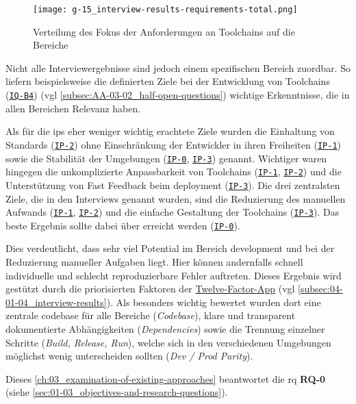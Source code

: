 \begin{figure}[h]
    \centering
    \texttt{[image: g-15\_interview-results-requirements-total.png]}
    \caption{Verteilung des Fokus der Anforderungen an Toolchains auf die Bereiche}
    \label{fig:g-15_interview-results-requirements-total}
\end{figure}

Nicht alle Interviewergebnisse sind jedoch einem spezifischen Bereich zuordbar. So liefern beispielsweise die definierten Ziele bei der Entwicklung von Toolchains (\texttt{\hyperref[subsec:AA-01-02_half-open-questions]{IQ-B4}}) (\acrshort{vgl} \autoref{subsec:AA-03-02_half-open-questions}) wichtige Erkenntnisse, die in allen Bereichen Relevanz haben.

Als für die \Glspl{ip} eher weniger wichtig erachtete Ziele wurden die Einhaltung von Standards (\texttt{\hyperref[sec:AA-02_interview-persons]{IP-2}}) ohne Einschränkung der Entwickler in ihren Freiheiten (\texttt{\hyperref[sec:AA-02_interview-persons]{IP-1}}) sowie die Stabilität der Umgebungen (\texttt{\hyperref[sec:AA-02_interview-persons]{IP-0}}, \texttt{{\hyperref[sec:AA-02_interview-persons]{IP-3}}}) genannt. Wichtiger waren hingegen die unkomplizierte Anpassbarkeit von Toolchains (\texttt{\hyperref[sec:AA-02_interview-persons]{IP-1}}, \texttt{\hyperref[sec:AA-02_interview-persons]{IP-2}}) und die Unterstützung von Fast Feedback beim \Gls{deployment} (\texttt{\hyperref[sec:AA-02_interview-persons]{IP-3}}). Die drei zentralsten Ziele, die in den Interviews genannt wurden, sind die Reduzierung des manuellen Aufwands (\texttt{\hyperref[sec:AA-02_interview-persons]{IP-1}}, \texttt{\hyperref[sec:AA-02_interview-persons]{IP-2}}) und die einfache Gestaltung der Toolchains (\texttt{\hyperref[sec:AA-02_interview-persons]{IP-3}}). Das beste Ergebnis sollte dabei über  erreicht werden (\texttt{\hyperref[sec:AA-02_interview-persons]{IP-0}}).

Dies verdeutlicht, dass sehr viel Potential im Bereich \Gls{development} und bei der Reduzierung manueller Aufgaben liegt. Hier können andernfalls schnell individuelle und schlecht reproduzierbare Fehler auftreten. Dieses Ergebnis wird gestützt durch die priorisierten Faktoren der \hyperref[sec:03-05_concept-of-twelve-factor-app]{Twelve-Factor-App} (\acrshort{vgl} \autoref{subsec:04-01-04_interview-results}). Als besonders wichtig bewertet wurden dort eine zentrale \Gls{codebase} für alle Bereiche (\textit{Codebase}), klare und transparent dokumentierte Abhängigkeiten (\textit{Dependencies}) sowie die Trennung einzelner Schritte (\textit{Build, Release, Run}), welche sich in den verschiedenen Umgebungen möglichst wenig unterscheiden sollten (\textit{Dev / Prod Parity}).

Dieses \autoref{ch:03_examination-of-existing-approaches} beantwortet die \acrlong{rq} \textbf{RQ-0} (siehe \autoref{sec:01-03_objectives-and-research-questions}).
